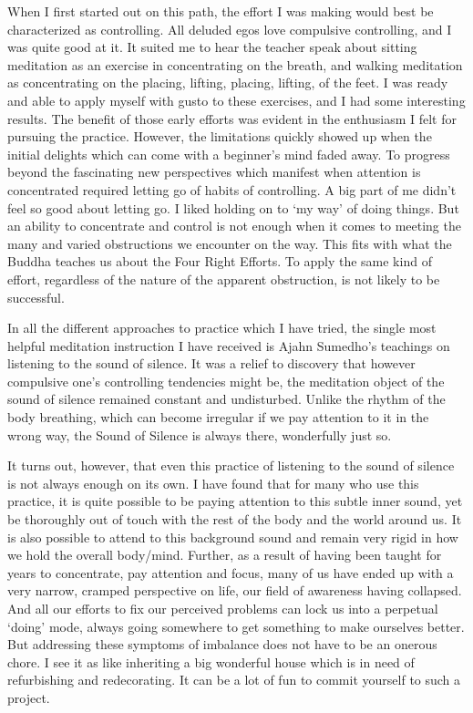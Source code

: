 When I first started out on this path, the effort I was making would
best be characterized as controlling. All deluded egos love compulsive
controlling, and I was quite good at it. It suited me to hear the
teacher speak about sitting meditation as an exercise in concentrating
on the breath, and walking meditation as concentrating on the placing,
lifting, placing, lifting, of the feet. I was ready and able to apply
myself with gusto to these exercises, and I had some interesting
results. The benefit of those early efforts was evident in the
enthusiasm I felt for pursuing the practice. However, the limitations
quickly showed up when the initial delights which can come with a
beginner’s mind faded away. To progress beyond the fascinating new
perspectives which manifest when attention is concentrated required
letting go of habits of controlling. A big part of me didn’t feel so
good about letting go. I liked holding on to ‘my way’ of doing things.
But an ability to concentrate and control is not enough when it comes to
meeting the many and varied obstructions we encounter on the way. This
fits with what the Buddha teaches us about the Four Right
Efforts\cite{right-effort}.
To apply the same kind of effort, regardless of the nature of the
apparent obstruction, is not likely to be successful.

In all the different approaches to practice which I have tried, the
single most helpful meditation instruction I have received is Ajahn
Sumedho’s teachings on listening to the sound of
silence.\cite{inner-listening}\cite{aj-sumedho-sound-of-silence}
It was a relief to discovery that however compulsive one’s controlling
tendencies might be, the meditation object of the sound of silence
remained constant and undisturbed. Unlike the rhythm of the body
breathing, which can become irregular if we pay attention to it in the
wrong way, the Sound of Silence is always there, wonderfully just so.

It turns out, however, that even this practice of listening to the sound
of silence is not always enough on its own. I have found that for many
who use this practice, it is quite possible to be paying attention to
this subtle inner sound, yet be thoroughly out of touch with the rest of
the body and the world around us. It is also possible to attend to this
background sound and remain very rigid in how we hold the overall
body/mind. Further, as a result of having been taught for years to
concentrate, pay attention and focus, many of us have ended up with a
very narrow, cramped perspective on life, our field of awareness having
collapsed. And all our efforts to fix our perceived problems can lock us
into a perpetual ‘doing’ mode, always going somewhere to get something
to make ourselves better. But addressing these symptoms of imbalance
does not have to be an onerous chore. I see it as like inheriting a big
wonderful house which is in need of refurbishing and redecorating. It
can be a lot of fun to commit yourself to such a project.

